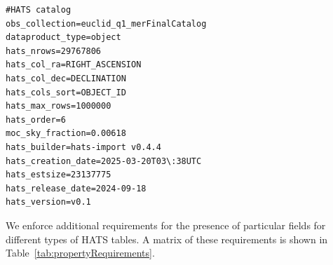 \documentclass[11pt,a4paper]{ivoa}
\begin{document}
\begin{minipage}{\linewidth}
\begin{lstlisting}[caption=Example \texttt{properties} file contents, label=fig:examplePropertiesFile]
#HATS catalog
obs_collection=euclid_q1_merFinalCatalog
dataproduct_type=object
hats_nrows=29767806
hats_col_ra=RIGHT_ASCENSION
hats_col_dec=DECLINATION
hats_cols_sort=OBJECT_ID
hats_max_rows=1000000
hats_order=6
moc_sky_fraction=0.00618
hats_builder=hats-import v0.4.4
hats_creation_date=2025-03-20T03\:38UTC
hats_estsize=23137775
hats_release_date=2024-09-18
hats_version=v0.1
\end{lstlisting}
\end{minipage}

We enforce additional requirements for the presence of particular fields for different types of HATS tables. 
A matrix of these requirements is shown in Table~\ref{tab:propertyRequirements}.
\end{document}
